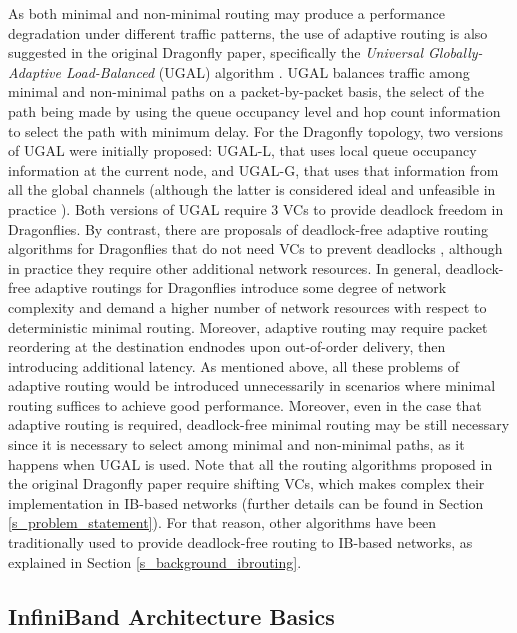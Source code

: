 \documentclass[review]{elsarticle}
\newcommand{\dflys}{Dragonflies}
\newcommand{\dfly}{Dragonfly}
\newcommand{\ib}{IB}
\newcommand{\ibl}{InfiniBand}
\begin{document}
As both minimal and non-minimal routing may produce a performance degradation under different traffic patterns, the use of adaptive routing is also suggested in the original \dfly{} paper,
specifically the \emph{Universal Globally-Adaptive Load-Balanced} (UGAL) algorithm \cite{singh-thesis2005}.
UGAL balances traffic among minimal and non-minimal paths on a packet-by-packet basis, the select of the path being made by using 
the queue occupancy level and hop count information to select the path with minimum delay.
For the \dfly{} topology, two versions of UGAL were initially proposed: UGAL-L, that uses local queue occupancy information at the current node,
and UGAL-G, that uses that information from all the global channels (although the latter is considered ideal and unfeasible in practice \cite{kim_technology-driven_2008}).
Both versions of UGAL require $3$ VCs to provide deadlock freedom in \dflys{}.
By contrast, there are proposals of deadlock-free adaptive routing algorithms for \dflys{} that do not need 
VCs to prevent deadlocks \cite{mgarcia2012_ofar, dxiang2016}, although in practice they require other additional network resources.
In general, deadlock-free adaptive routings for \dflys{} introduce some degree of network complexity and demand a higher number of network resources with respect to deterministic minimal routing.
Moreover, adaptive routing may require packet reordering at the destination endnodes upon out-of-order delivery, then introducing additional latency.
As mentioned above, all these problems of adaptive routing would be introduced unnecessarily in scenarios where minimal routing suffices to achieve good performance.
Moreover, even in the case that adaptive routing is required, deadlock-free minimal routing may be still necessary since it is necessary
to select among minimal and non-minimal paths, as it happens when UGAL is used.
Note that all the routing algorithms proposed in the original \dfly{} paper \cite{kim_technology-driven_2008} require shifting VCs, which makes complex their implementation
in \ib-based networks (further details can be found in Section \ref{s_problem_statement}).
For that reason, other algorithms have been traditionally used to provide deadlock-free routing to \ib-based networks, as explained in Section \ref{s_background_ibrouting}.

\subsection{\ibl{} Architecture Basics}
\label{s_background_iba}
\end{document}
